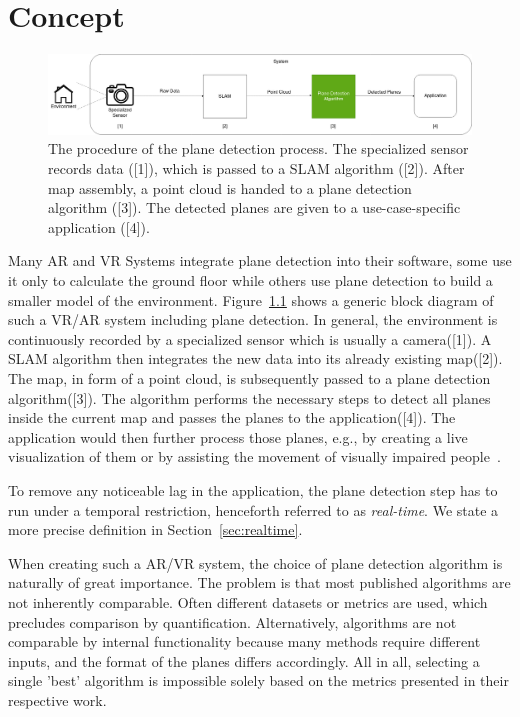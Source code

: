\documentclass[main.tex]{subfiles}
\begin{document}
\chapter{Concept} \label{chap:Concept}


\begin{figure}[H]
    \centering
    \includegraphics[width=15 cm]{images/concept_specific.png}
    \caption[AR/VR System Overview]{The procedure of the plane detection process. The specialized sensor records data ([1]), which is passed to
        a SLAM algorithm ([2]). After map assembly, a point cloud is handed to a plane detection algorithm ([3]).
        The detected planes are given to a use-case-specific application ([4]).}
    \label{fig:concept}
\end{figure}

Many AR and VR Systems integrate plane detection into their software, some use it only to calculate the ground floor while others use plane detection to
build a smaller model of the environment.
Figure~\ref{fig:concept} shows a generic block diagram of such a VR/AR system including plane detection.
In general, the environment is continuously recorded by a specialized sensor which is usually a camera([1]). A SLAM algorithm then integrates the new data into its already existing map([2]). The map, in form of a point cloud,
is subsequently passed to a plane detection algorithm([3]). The algorithm performs the necessary steps to detect all planes inside the current map and passes the planes to the application([4]).
The application would then further process those planes, e.g., by creating a live visualization of them or by assisting the movement of visually impaired people~\cite{Carranza_Estrella_Zaidi_Carranza_2021}.

To remove any noticeable lag in the application, the plane detection step has to run under a temporal restriction, henceforth referred to as \textit{real-time}.
We state a more precise definition in Section~\ref{sec:realtime}.

When creating such a AR/VR system, the choice of plane detection algorithm is naturally of great importance. The problem is that most published algorithms are not inherently comparable.
Often different datasets or metrics are used, which precludes comparison by quantification. Alternatively, algorithms are not comparable by internal functionality
because many methods require different inputs, and the format of the planes differs accordingly. All in all, selecting a single 'best' algorithm is impossible solely based on the metrics presented in their
respective work.
\end{document}
